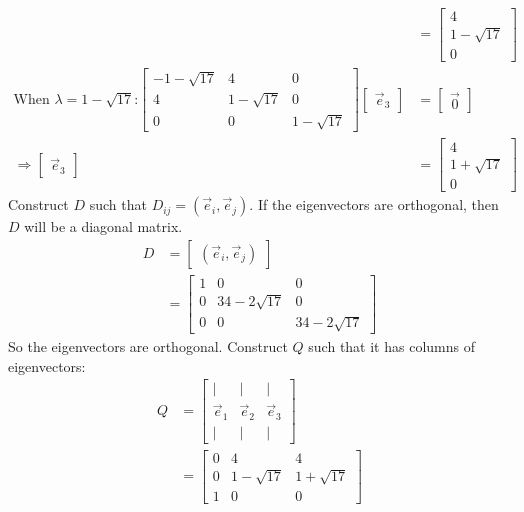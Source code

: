 \documentclass[11pt]{homework}
\begin{document}
\begin{align*}
    &=
    \begin{bmatrix}
    4 \\
    1 - \sqrt{17}\\
    0
    \end{bmatrix} \\
  \text{When $\lambda = 1 - \sqrt{17}$:}
    \begin{bmatrix}
      -1 - \sqrt{17} & 4 & 0 \\
      4 & 1-\sqrt{17}  & 0 \\
      0 & 0 & 1-\sqrt{17}
    \end{bmatrix}
    \begin{bmatrix}
      \vec e_3
    \end{bmatrix}
    &=
    \begin{bmatrix}
      \vec 0
    \end{bmatrix} \\
    \Rightarrow
    \begin{bmatrix}
      \vec e_3
    \end{bmatrix}
    &=
    \begin{bmatrix}
    4 \\
    1 + \sqrt{17}\\
    0
    \end{bmatrix}
\end{align*}
Construct $D$ such that $D_{ij} = (\vec e_i, \vec e_j)$. 
If the eigenvectors are orthogonal, 
then $D$ will be a diagonal matrix.
\begin{align*}
D &= 
  \begin{bmatrix}
  (\vec e_i, \vec e_j)
  \end{bmatrix} \\
  &=
  \begin{bmatrix}
  1 & 0 & 0 \\
  0 & 34 - 2 \sqrt{17} & 0 \\
  0 & 0 & 34 - 2 \sqrt{17} 
  \end{bmatrix}
\end{align*}
So the eigenvectors are orthogonal.
Construct $Q$ such that it has
columns of eigenvectors:
\begin{align*}
Q &= 
  \begin{bmatrix}
  | & | & |  \\
  \vec e_1 & \vec e_2 & \vec e_3 \\
  | & | & |
  \end{bmatrix}\\
  &=
  \begin{bmatrix}
  0 & 4 & 4 \\ 
  0 & 1- \sqrt{17} & 1+\sqrt{17} \\
  1 & 0 & 0
  \end{bmatrix}
\end{align*}
\end{document}
